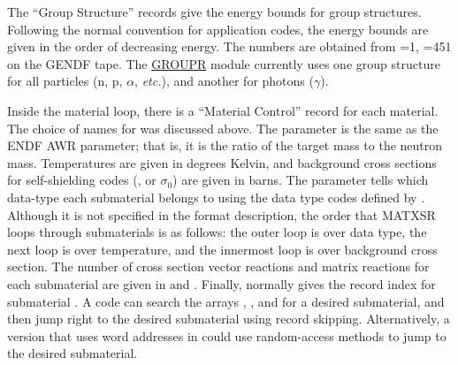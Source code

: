 The ``Group Structure'' records give the energy bounds for
 group structures.  Following the normal convention for
application codes, the energy bounds are given in the order of
decreasing energy.  The numbers are obtained from =1,
=451 on the GENDF tape.  The \hyperlink{sGROUPRhy}{GROUPR}
module currently uses one group structure for
all particles (n, p, $\alpha$, {\it etc.}), and another for photons ($\gamma$).

Inside the material loop, there is a ``Material Control'' record for
each material.  The choice of names for  was discussed above.
The  parameter is the same as the ENDF AWR parameter;
that is, it is the ratio of the target mass to the neutron mass.
Temperatures  are given in degrees Kelvin, and background
cross sections for self-shielding codes (, or $\sigma_0$)
are given in barns. The parameter  tells which data-type
each submaterial belongs to using the data type codes defined by
.  Although it is not specified in the format description,
the order that MATXSR loops through
submaterials is as follows:
the outer loop is over data type, the next loop is over temperature,
and the innermost loop is over background cross section.  The number of
cross section vector reactions and matrix reactions for each submaterial
are given in  and .  Finally, 
normally gives the record index for submaterial .  A code can
search the arrays , , and  for a
desired submaterial, and then jump right to the desired submaterial
using record skipping.  Alternatively, a version that uses word
addresses in  could use random-access methods to jump to
the desired submaterial.

